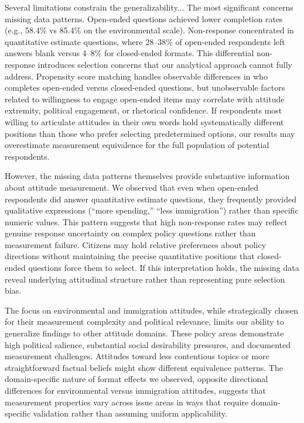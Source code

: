 \documentclass[
  journal=ram,
  manuscript=article-type,
  year=2025,
  volume=unpublished,
]{cup-journal}
\begin{document}
Several limitations constrain the generalizability... The most significant concerns missing data patterns. Open-ended questions achieved lower completion rates (e.g., 58.4\% vs 85.4\% on the environmental scale). Non-response concentrated in quantitative estimate questions, where 28–38\% of open-ended respondents left answers blank versus 4–8\% for closed-ended formats.
This differential non-response introduces selection concerns that our analytical approach cannot fully address.
Propensity score matching handles observable differences in who completes open-ended versus closed-ended questions, but unobservable factors related to willingness to engage open-ended items may correlate with attitude extremity, political engagement, or rhetorical confidence.
If respondents most willing to articulate attitudes in their own words hold systematically different positions than those who prefer selecting predetermined options, our results may overestimate measurement equivalence for the full population of potential respondents.

However, the missing data patterns themselves provide substantive information about attitude measurement.
We observed that even when open-ended respondents did answer quantitative estimate questions, they frequently provided qualitative expressions (“more spending,” “less immigration”) rather than specific numeric values.
This pattern suggests that high non-response rates may reflect genuine response uncertainty on complex policy questions rather than measurement failure.
Citizens may hold relative preferences about policy directions without maintaining the precise quantitative positions that closed-ended questions force them to select.
If this interpretation holds, the missing data reveal underlying attitudinal structure rather than representing pure selection bias.

The focus on environmental and immigration attitudes, while strategically chosen for their measurement complexity and political relevance, limits our ability to generalize findings to other attitude domains.
These policy areas demonstrate high political salience, substantial social desirability pressures, and documented measurement challenges.
Attitudes toward less contentious topics or more straightforward factual beliefs might show different equivalence patterns.
The domain-specific nature of format effects we observed, opposite directional differences for environmental versus immigration attitudes, suggests that measurement properties vary across issue areas in ways that require domain-specific validation rather than assuming uniform applicability.
\end{document}

